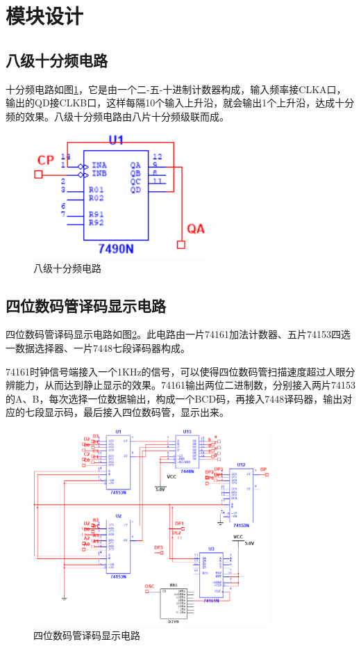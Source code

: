 \documentclass[12pt]{article}
\begin{document}
\newpage
\section{模块设计}

\subsection{八级十分频电路}

十分频电路如图\ref*{fig:div8}，它是由一个二-五-十进制计数器构成，输入频率接CLKA口，输出的QD接CLKB口，这样每隔10个输入上升沿，就会输出1个上升沿，达成十分频的效果。八级十分频电路由八片十分频级联而成。

\begin{figure}[H]
    \centering
    \includegraphics[width=0.6\textwidth]{./fig/div8.jpg}
    \caption{八级十分频电路}
    \label{fig:div8}
\end{figure}

\subsection{四位数码管译码显示电路}

四位数码管译码显示电路如图\ref*{fig:4scan}。此电路由一片74161加法计数器、五片74153四选一数据选择器、一片7448七段译码器构成。

74161时钟信号端接入一个1KHz的信号，可以使得四位数码管扫描速度超过人眼分辨能力，从而达到静止显示的效果。74161输出两位二进制数，分别接入两片74153的A、B，每次选择一位数据输出，构成一个BCD码，再接入7448译码器，输出对应的七段显示码，最后接入四位数码管，显示出来。

\begin{figure}[H]
    \centering
    \includegraphics[width=0.8\textwidth]{./fig/4scan.png}
    \caption{四位数码管译码显示电路}
    \label{fig:4scan}
\end{figure}
\end{document}
